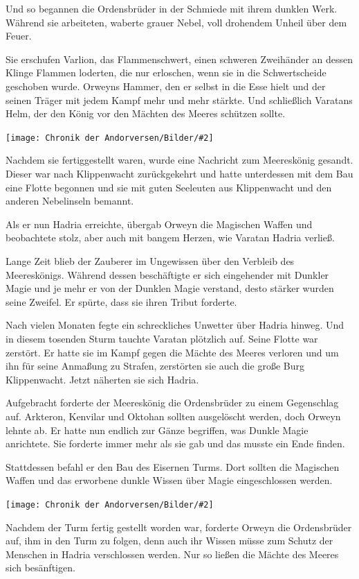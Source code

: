 \documentclass[10pt, a4paper, oneside]{book}
\newcommand{\bildmitts}[2][height=0.32\textwidth,width=0.48\textwidth,keepaspectratio]{%
    \begin{center}
        \texttt{[image: Chronik der Andorversen/Bilder/\#2]}
    \end{center}
}
\begin{document}
\begin{multicols}{2}
Und so begannen die Ordensbrüder in der Schmiede mit ihrem dunklen Werk.  Während sie arbeiteten, waberte grauer Nebel, voll drohendem Unheil über dem Feuer.\bigskip

Sie erschufen Varlion, das Flammenschwert, einen schweren Zweihänder an dessen Klinge Flammen loderten, die nur erloschen, wenn sie in die Schwertscheide geschoben wurde. Orweyns Hammer, den er selbst in die Esse hielt und der seinen Träger mit jedem Kampf mehr und mehr stärkte. Und schließlich Varatans Helm, der den König vor den Mächten des Meeres schützen sollte.\bigskip

\bildmitts{Die Zwei Orden (2014).jpeg}

Nachdem sie fertiggestellt waren, wurde eine Nachricht zum Meereskönig gesandt. Dieser war nach Klippenwacht zurückgekehrt und hatte unterdessen mit dem Bau eine Flotte begonnen und sie mit guten Seeleuten aus Klippenwacht und den anderen Nebelinseln bemannt.\bigskip

Als er nun Hadria erreichte, übergab Orweyn die Magischen Waffen und beobachtete stolz, aber auch mit bangem Herzen, wie Varatan Hadria verließ.\bigskip

Lange Zeit blieb der Zauberer im Ungewissen über den Verbleib des Meereskönigs. Während dessen beschäftigte er sich eingehender mit Dunkler Magie und je mehr er von der Dunklen Magie verstand, desto stärker wurden seine Zweifel. Er spürte, dass sie ihren Tribut forderte.\bigskip

Nach vielen Monaten fegte ein schreckliches Unwetter über Hadria hinweg. Und in diesem tosenden Sturm tauchte Varatan plötzlich auf. Seine Flotte war zerstört. Er hatte sie im Kampf gegen die Mächte des Meeres verloren und um ihn für seine Anmaßung zu Strafen, zerstörten sie auch die große Burg Klippenwacht. Jetzt näherten sie sich Hadria.\bigskip

Aufgebracht forderte der Meereskönig die Ordensbrüder zu einem Gegenschlag auf. Arkteron, Kenvilar und Oktohan sollten ausgelöscht werden, doch Orweyn lehnte ab. Er hatte nun endlich zur Gänze begriffen, was Dunkle Magie anrichtete. Sie forderte immer mehr als sie gab und das musste ein Ende finden.\bigskip

Stattdessen befahl er den Bau des Eisernen Turms. Dort sollten die Magischen Waffen und das erworbene dunkle Wissen über Magie eingeschlossen werden.\bigskip

\bildmitts{Die Zwei Orden Bild 1.jpg}

Nachdem der Turm fertig gestellt worden war, forderte Orweyn die Ordensbrüder auf, ihm in den Turm zu folgen, denn auch ihr Wissen müsse zum Schutz der Menschen in Hadria verschlossen werden. Nur so ließen die Mächte des Meeres sich besänftigen.\bigskip


\end{multicols}
\end{document}
